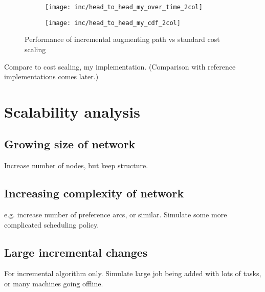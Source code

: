 \begin{figure}
    \begin{widepage}
    \begin{subfigure}[c]{0.5\textwidth}
        \texttt{[image: inc/head\_to\_head\_my\_over\_time\_2col]}
    \end{subfigure}
    \begin{subfigure}[c]{0.5\textwidth}
        \texttt{[image: inc/head\_to\_head\_my\_cdf\_2col]}
    \end{subfigure}
    \end{widepage}
    \caption{Performance of incremental augmenting path vs standard cost scaling}
    \label{fig:inc-head-to-head-my}
\end{figure}

Compare to cost scaling, my implementation. (Comparison with reference implementations comes later.) 

\section{Scalability analysis}

\subsection{Growing size of network}

Increase number of nodes, but keep structure.

\subsection{Increasing complexity of network}

e.g. increase number of preference arcs, or similar. Simulate some more complicated scheduling policy.

\subsection{Large incremental changes}

For incremental algorithm only. Simulate large job being added with lots of tasks, or many machines going offline.

